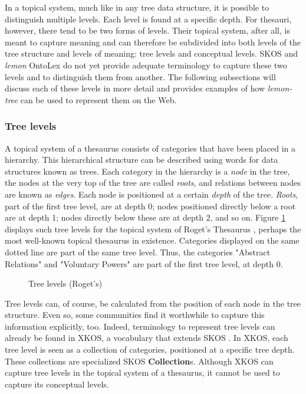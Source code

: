 In a topical system, much like in any tree data structure, it is possible to distinguish multiple levels. 
Each level is found at a specific depth. 
For thesauri, however, there tend to be two forms of levels. 
Their topical system, after all, is meant to capture meaning and can therefore be subdivided into both levels of the tree structure and levels of meaning: tree levels and conceptual levels. 
SKOS and \emph{lemon} OntoLex do not yet provide adequate terminology to capture these two levels and to distinguish them from another.  
The following subsections will discuss each of these levels in more detail and provides examples of how \emph{lemon-tree} can be used to represent them on the Web.

\subsubsection{Tree levels}

A topical system of a thesaurus consists of categories that have been placed in a hierarchy. 
This hierarchical structure can be described using words for data structures known as trees. 
Each category in the hierarchy is a \emph{node} in the tree, the nodes at the very top of the tree are called \emph{roots}, and relations between nodes are known as \emph{edges}. 
Each node is positioned at a certain \emph{depth} of the tree. \emph{Roots}, part of the first tree level, are at depth 0; nodes positioned directly below a root are at depth 1; nodes directly below these are at depth 2, and so on.
Figure \ref{fig:Stolk2019a:Roget-TreeLevel} displays such tree levels for the topical system of Roget's Thesaurus \cite{ref-Roget}, perhaps the most well-known topical thesaurus in existence. 
Categories displayed on the same dotted line are part of the same tree level. Thus, the categories "Abstract Relations" and "Voluntary Powers" are part of the first tree level, at depth 0. 

\begin{figure}[htbp]
	\framebox[\textwidth]{
		\scalebox{0.5}[0.5]{
			
		}
	}
	\caption[]{\label{fig:Stolk2019a:Roget-TreeLevel} Tree levels (Roget's)}
\end{figure} 

Tree levels can, of course, be calculated from the position of each node in the tree structure. 
Even so, some communities find it worthwhile to capture this information explicitly, too. 
Indeed, terminology to represent tree levels can already be found in XKOS, a vocabulary that extends SKOS \cite{ref-XKOS}. 
In XKOS, each tree level is seen as a collection of categories, positioned at a specific tree depth. 
These collections are specialized SKOS \textbf{Collection}s. 
Although XKOS can capture tree levels in the topical system of a thesaurus, it cannot be used to capture its conceptual levels.

